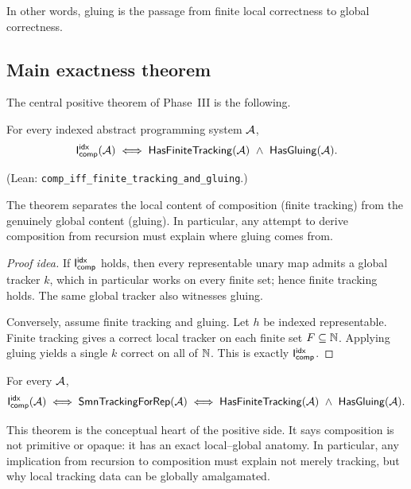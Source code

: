 \documentclass[11pt]{article}
\begin{document}
In other words, gluing is the passage from finite local correctness to global correctness.

\subsection{Main exactness theorem}

The central positive theorem of Phase~III is the following.

\begin{theorem}\label{thm:main-exact}
For every indexed abstract programming system \(\mathcal{A}\),
\[
\mathsf{I}_{\mathsf{comp}}^{\mathsf{idx}}(\mathcal{A})
\;\Longleftrightarrow\;
\mathsf{HasFiniteTracking}(\mathcal{A})\ \wedge\ \mathsf{HasGluing}(\mathcal{A}).
\]
\end{theorem}
(Lean: \texttt{comp\_iff\_finite\_tracking\_and\_gluing}.)

\begin{remark}
The theorem separates the local content of composition (finite tracking) from the genuinely global content (gluing).  In particular, any attempt to derive composition from recursion must explain where gluing comes from.
\end{remark}

\begin{proof}[Proof idea]
If \(\mathsf{I}_{\mathsf{comp}}^{\mathsf{idx}}\) holds, then every representable unary map admits a global tracker \(k\), which in particular works on every finite set; hence finite tracking holds.  The same global tracker also witnesses gluing.

Conversely, assume finite tracking and gluing.  Let \(h\) be indexed representable.  Finite tracking gives a correct local tracker on each finite set \(F\subseteq \mathbb{N}\).  Applying gluing yields a single \(k\) correct on all of \(\mathbb{N}\).  This is exactly \(\mathsf{I}_{\mathsf{comp}}^{\mathsf{idx}}\).
\end{proof}

\begin{corollary}\label{cor:refined}
For every \(\mathcal{A}\),
\[
\mathsf{I}_{\mathsf{comp}}^{\mathsf{idx}}(\mathcal{A})
\;\Longleftrightarrow\;
\mathsf{SmnTrackingForRep}(\mathcal{A})
\;\Longleftrightarrow\;
\mathsf{HasFiniteTracking}(\mathcal{A})\ \wedge\ \mathsf{HasGluing}(\mathcal{A}).
\]
\end{corollary}

This theorem is the conceptual heart of the positive side.  It says composition is not primitive or opaque: it has an exact local--global anatomy.  In particular, any implication from recursion to composition must explain not merely tracking, but why local tracking data can be globally amalgamated.
\end{document}
